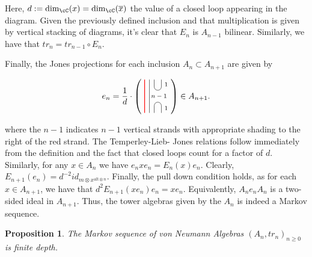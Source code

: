 \documentclass[11pt]{article}
\theoremstyle{plain}
\newtheorem{prop}[thm]{Proposition}
\theoremstyle{definition}
\newcommand{\xalt}{x^{\text{alt}\otimes n}}
\begin{document}
Here, $d:=\dim_{\cC}(x)=\dim_{\cC}(\overline{x})$ the value of a closed loop appearing in the diagram. %
Given the previously defined inclusion and that multiplication is given by vertical stacking of diagrams, it's clear that $E_n$ is $A_{n-1}$ bilinear. Similarly, we have that $tr_n=tr_{n-1} \circ E_n$.

Finally, the Jones projections for each inclusion $A_{n}\subset A_{n+1}$ are given by

\begin{equation}\label{eq:JonesProjections}
e_n=
\frac1d\cdot
\left(\,\,
\begin{tikzpicture}[baseline=-.1cm]
	\draw[thick, red] (-.3,-.7) -- (-.3,.7);
	\draw (-.1,-.7) -- (-.1,.7);
	\draw (.1,-.7) -- (.1,-.4) arc (180:0:.15cm) -- (.4,-.7);
	\draw (.1,.7) -- (.1,.4) arc (-180:0:.15cm) -- (.4,.7);
	\node at (.3,0) {\scriptsize{$n-1$}};
	\node at (.6,.5) {\scriptsize{$1$}};
	\node at (.6,-.5) {\scriptsize{$1$}};
\end{tikzpicture}
\right)
\in
A_{n+1}.
\end{equation}

where the $n-1$ indicates $n-1$ vertical strands with appropriate shading to the right of the red strand. The Temperley-Lieb- %
Jones relations follow immediately from the definition and the fact that closed loops count for a factor of $d$. Similarly, 
for any $x\in A_n$ we have $e_nxe_n=E_n(x)e_n$. Clearly, $E_{n+1}(e_n)=d^{-2}id_{m \otimes \xalt}$. Finally, the pull 
down condition %
holds, as for each $x\in A_{n+1}$, we have that $d^2 E_{n+1}(xe_n)e_n=xe_n$. Equivalently, $A_{n} e_n A_n$ is a 
two-sided ideal in $A_{n+1}$. Thus, the tower algebras given by the $A_n$ is indeed a Markov sequence.
 
\begin{prop}
The Markov sequence of von Neumann Algebras $(A_n, tr_n)_{n\geq 0}$ is finite depth.
\end{prop}
\end{document}
